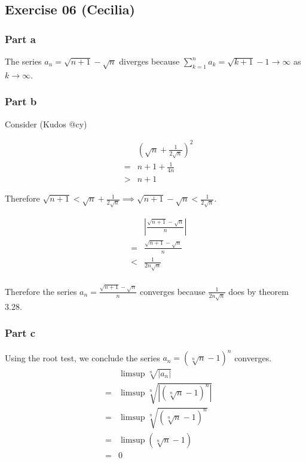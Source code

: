 \subsection*{Exercise 06 (Cecilia)}
\subsubsection*{Part a}
The series $ a_n = \sqrt{n + 1} - \sqrt{n} $ diverges because $ \sum\limits_{k=1}^{n} a_k = \sqrt{k + 1} - 1 \to \infty $ as $ k \to \infty $.

\subsubsection*{Part b}
Consider (Kudos @cy)

\begin{eqnarray*}
  & & \left(\sqrt{n} + \frac{1}{2\sqrt{n}}\right)^2 \\
  &=& n + 1 + \frac{1}{4n} \\
  &>& n + 1
\end{eqnarray*}

Therefore $ \sqrt{n + 1} < \sqrt{n} + \frac{1}{2\sqrt{n}} \implies \sqrt{n + 1} - \sqrt{n} < \frac{1}{2\sqrt{n}} $.

\begin{eqnarray*}
  & & \left|\frac{\sqrt{n+1} - \sqrt{n}}{n} \right| \\
  &=& \frac{\sqrt{n+1} - \sqrt{n}}{n} \\
  &<& \frac{1}{2n\sqrt{n}} \\
\end{eqnarray*}

Therefore the series $ a_n = \frac{\sqrt{n + 1} - \sqrt{n}}{n} $ converges because $ \frac{1}{2n\sqrt{n}} $ does by theorem 3.28.

\subsubsection*{Part c}

Using the root test, we conclude the series $ a_n = (\sqrt[n]{n}-1)^n $ converges.
\begin{eqnarray*}
    & & \limsup \sqrt[n]{|a_n|} \\
    &=& \limsup \sqrt[n]{|(\sqrt[n]{n}-1)^n|} \\
    &=& \limsup \sqrt[n]{(\sqrt[n]{n}-1)^n} \\
    &=& \limsup (\sqrt[n]{n}-1) \\
    &=& 0
\end{eqnarray*}

